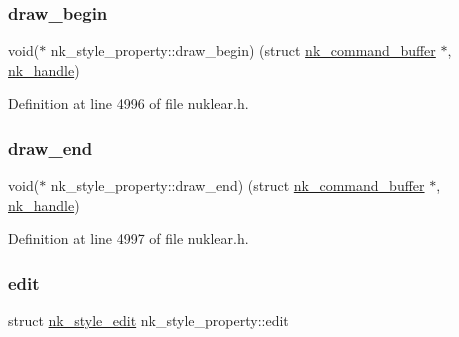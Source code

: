 \mbox{\label{structnk__style__property_a2aef0170ff75d320823a03b6d86b002a}} 
\subsubsection{\texorpdfstring{draw\+\_\+begin}{draw\_begin}}
{\footnotesize\ttfamily void($\ast$ nk\+\_\+style\+\_\+property\+::draw\+\_\+begin) (struct \mbox{\hyperlink{structnk__command__buffer}{nk\+\_\+command\+\_\+buffer}} $\ast$, \mbox{\hyperlink{unionnk__handle}{nk\+\_\+handle}})}



Definition at line 4996 of file nuklear.\+h.

\mbox{\label{structnk__style__property_a58a86e4d8e78c917022bf2755d1bffa0}} 
\subsubsection{\texorpdfstring{draw\+\_\+end}{draw\_end}}
{\footnotesize\ttfamily void($\ast$ nk\+\_\+style\+\_\+property\+::draw\+\_\+end) (struct \mbox{\hyperlink{structnk__command__buffer}{nk\+\_\+command\+\_\+buffer}} $\ast$, \mbox{\hyperlink{unionnk__handle}{nk\+\_\+handle}})}



Definition at line 4997 of file nuklear.\+h.

\mbox{\label{structnk__style__property_a535d43c8849cb49b3ec2fcd959512c60}} 
\subsubsection{\texorpdfstring{edit}{edit}}
{\footnotesize\ttfamily struct \mbox{\hyperlink{structnk__style__edit}{nk\+\_\+style\+\_\+edit}} nk\+\_\+style\+\_\+property\+::edit}



